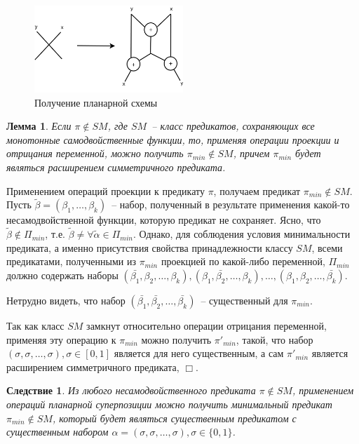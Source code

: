 \documentclass[12pt]{extarticle}
\newtheorem{lemma}[theorem]{Лемма}
\newtheorem{corollary}[theorem]{Следствие}
\newenvironment{proof}[1][Доказательство.]{\begin{trivlist}
\item[\hskip \labelsep {\bfseries #1}]}{\end{trivlist}}
\begin{document}
\begin{figure}[htb]
\centering
\includegraphics[width=0.5\textwidth]{intersection.png}
\caption{Получение планарной схемы}
\label{fig:xor}
\end{figure}

\begin{lemma}
\label{eq:lemma_sm}
Если $\pi \notin SM$, где $SM$~-- класс предикатов, сохраняющих все монотонные самодвойственные функции,
то, применяя операции проекции и отрицания переменной,
можно получить $\pi_{min} \notin SM$, причем $\pi_{min}$ будет являться расширением симметричного предиката.
\end{lemma}

\begin{proof}
Применением операций проекции к предикату $\pi$, получаем предикат $\pi_{min} \notin SM$. 
Пусть $\widetilde{\beta} = (\beta_1, \dots, \beta_k)$~-- набор, полученный в результате
применения какой-то несамодвойственной функции, которую предикат не сохраняет.
Ясно, что $\widetilde{\beta} \notin \Pi_{min}$, т.е. $\widetilde{\beta} \neq \forall \widetilde{\alpha} \in \Pi_{min}$.
Однако, для соблюдения условия 
минимальности предиката, а именно присутствия свойства принадлежности классу $SM$, всеми предикатами, полученными
из $\pi_{min}$ проекцией по какой-либо переменной,
$\Pi_{min}$ должно содержать наборы 
$(\bar{\beta_1}, \beta_2, \dots, \beta_k), (\beta_1, \bar{\beta_2}, \dots, \beta_k), \dots, (\beta_1, \beta_2, \dots, \bar{\beta_k})$.

Нетрудно видеть, что набор $(\bar{\beta_1}, \bar{\beta_2}, \dots, \bar{\beta_k})$~-- существенный для $\pi_{min}$.

Так как класс $SM$ замкнут относительно операции отрицания переменной,
применяя эту операцию к $\pi_{min}$ можно получить $\pi'_{min}$,
такой, что набор $(\sigma, \sigma, \dots, \sigma), \sigma \in [0,1]$ является для него существенным, а сам $\pi'_{min}$ является расширением 
симметричного предиката, $\Box$.
\end{proof}

\begin{corollary}
\label{lemma_sm_corollary} Из любого несамодвойственного предиката 
$\pi \notin SM $, применением операций планарной суперпозиции можно получить минимальный предикат $\pi_{min} \notin SM$,
который будет являться существенным предикатом с существенным набором
$ \alpha = (\sigma, \sigma, \dots, \sigma), \sigma \in \{0, 1\}$.
\end{corollary}
\end{document}

